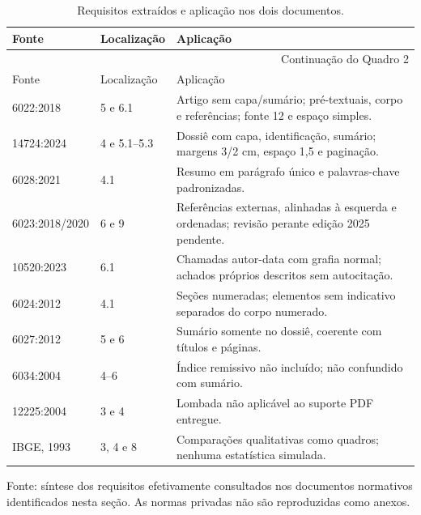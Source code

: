 \begin{singlespace}
\begin{longtable}{|p{}|p{}|p{}|}
\caption{Requisitos extraídos e aplicação nos dois documentos.}\\\hline
Fonte & Localização & Aplicação \\\hline\endfirsthead
\multicolumn{3}{r}{\footnotesize Continuação do Quadro 2}\\\hline
Fonte & Localização & Aplicação \\\hline\endhead
6022:2018 & 5 e 6.1 & Artigo sem capa/sumário; pré-textuais, corpo e referências; fonte 12 e espaço simples.\\\hline
14724:2024 & 4 e 5.1--5.3 & Dossiê com capa, identificação, sumário; margens 3/2 cm, espaço 1,5 e paginação.\\\hline
6028:2021 & 4.1 & Resumo em parágrafo único e palavras-chave padronizadas.\\\hline
6023:2018/2020 & 6 e 9 & Referências externas, alinhadas à esquerda e ordenadas; revisão perante edição 2025 pendente.\\\hline
10520:2023 & 6.1 & Chamadas autor-data com grafia normal; achados próprios descritos sem autocitação.\\\hline
6024:2012 & 4.1 & Seções numeradas; elementos sem indicativo separados do corpo numerado.\\\hline
6027:2012 & 5 e 6 & Sumário somente no dossiê, coerente com títulos e páginas.\\\hline
6034:2004 & 4--6 & Índice remissivo não incluído; não confundido com sumário.\\\hline
12225:2004 & 3 e 4 & Lombada não aplicável ao suporte PDF entregue.\\\hline
IBGE, 1993 & 3, 4 e 8 & Comparações qualitativas como quadros; nenhuma estatística simulada.\\\hline
\end{longtable}
\noindent\footnotesize Fonte: síntese dos requisitos efetivamente consultados nos documentos normativos identificados nesta seção. As normas privadas não são reproduzidas como anexos.
\end{singlespace}
